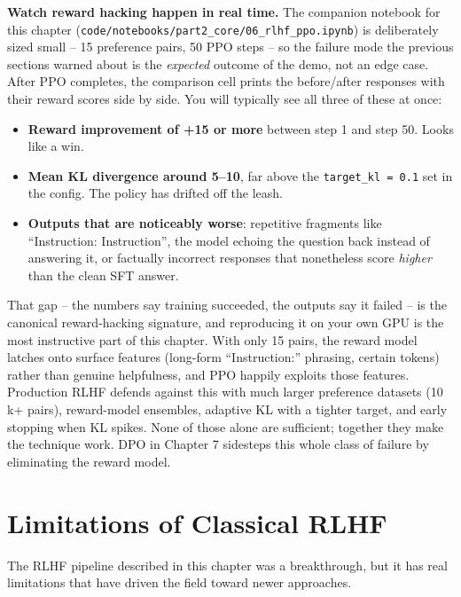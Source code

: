 \begin{chapterenv}
\begin{tipbox}
\textbf{Watch reward hacking happen in real time.} The companion notebook for this chapter (\texttt{code/notebooks/part2\_core/06\_rlhf\_ppo.ipynb}) is deliberately sized small -- 15 preference pairs, 50 PPO steps -- so the failure mode the previous sections warned about is the \emph{expected} outcome of the demo, not an edge case. After PPO completes, the comparison cell prints the before/after responses with their reward scores side by side. You will typically see all three of these at once:

\begin{itemize}[nosep]
    \item \textbf{Reward improvement of +15 or more} between step 1 and step 50. Looks like a win.
    \item \textbf{Mean KL divergence around 5--10}, far above the \texttt{target\_kl = 0.1} set in the config. The policy has drifted off the leash.
    \item \textbf{Outputs that are noticeably worse}: repetitive fragments like ``Instruction: Instruction'', the model echoing the question back instead of answering it, or factually incorrect responses that nonetheless score \emph{higher} than the clean SFT answer.
\end{itemize}

That gap -- the numbers say training succeeded, the outputs say it failed -- is the canonical reward-hacking signature, and reproducing it on your own GPU is the most instructive part of this chapter. With only 15 pairs, the reward model latches onto surface features (long-form ``Instruction:'' phrasing, certain tokens) rather than genuine helpfulness, and PPO happily exploits those features. Production RLHF defends against this with much larger preference datasets (10\,k+ pairs), reward-model ensembles, adaptive KL with a tighter target, and early stopping when KL spikes. None of those alone are sufficient; together they make the technique work. DPO in Chapter 7 sidesteps this whole class of failure by eliminating the reward model.
\end{tipbox}

\section{Limitations of Classical RLHF}

The RLHF pipeline described in this chapter was a breakthrough, but it has real limitations that have driven the field toward newer approaches.


\end{chapterenv}
